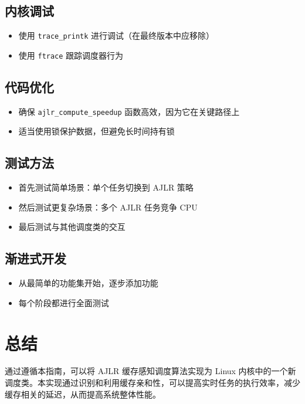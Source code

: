 \documentclass[a4paper,12pt]{article}
\begin{document}
\subsection{内核调试}
\begin{itemize}
  \item 使用 \texttt{trace\_printk} 进行调试（在最终版本中应移除）
  \item 使用 \texttt{ftrace} 跟踪调度器行为
\end{itemize}

\subsection{代码优化}
\begin{itemize}
  \item 确保 \texttt{ajlr\_compute\_speedup} 函数高效，因为它在关键路径上
  \item 适当使用锁保护数据，但避免长时间持有锁
\end{itemize}

\subsection{测试方法}
\begin{itemize}
  \item 首先测试简单场景：单个任务切换到 AJLR 策略
  \item 然后测试更复杂场景：多个 AJLR 任务竞争 CPU
  \item 最后测试与其他调度类的交互
\end{itemize}

\subsection{渐进式开发}
\begin{itemize}
  \item 从最简单的功能集开始，逐步添加功能
  \item 每个阶段都进行全面测试
\end{itemize}

\section{总结}

通过遵循本指南，可以将 AJLR 缓存感知调度算法实现为 Linux 内核中的一个新调度类。本实现通过识别和利用缓存亲和性，可以提高实时任务的执行效率，减少缓存相关的延迟，从而提高系统整体性能。
\end{document}
